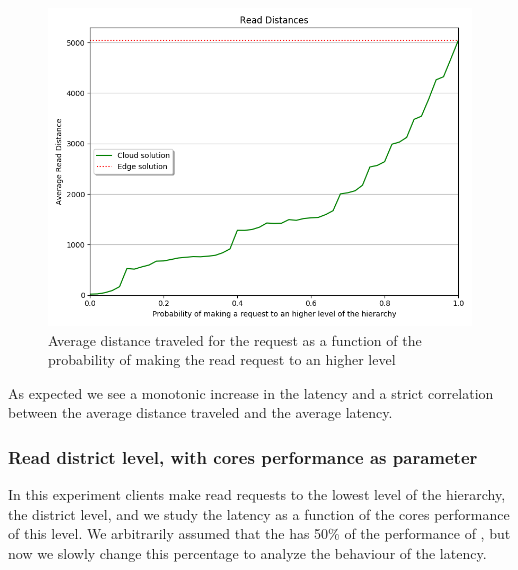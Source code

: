 \begin{figure}[H]
    \centering
    \includegraphics[width=0.95\linewidth]{Figures/Evaluation/read-all-distance.png}
     \caption{Average distance traveled for the request as a function of the probability of making the read request to an higher level}
    \label{fig:/read-all-distance}
\end{figure}

As expected we see a monotonic increase in the latency and a strict correlation between the average distance traveled and the average latency.

\subsubsection{Read district level, with cores performance as parameter}
In this experiment clients make read requests to the lowest level of the hierarchy, the district level, and we study the latency as a function of the cores performance of this level.
We arbitrarily assumed that the  has 50\% of the performance of , but now we slowly change this percentage to analyze the behaviour of the latency.

